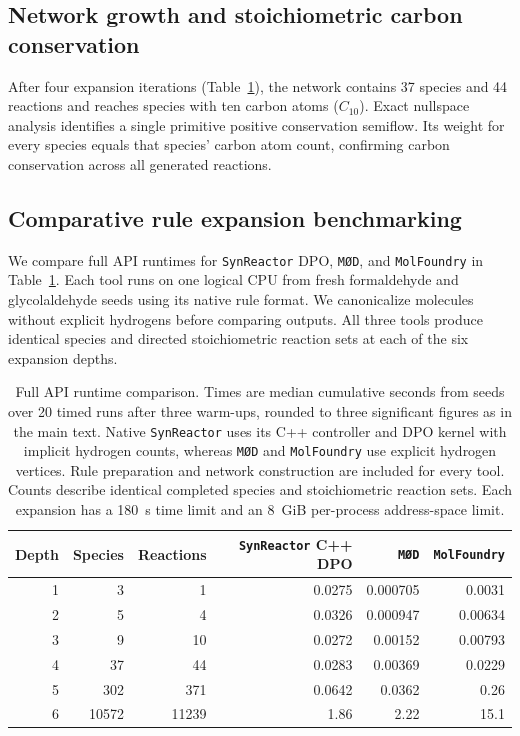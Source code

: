 \documentclass[10pt,a4paper,fleqn]{article}
\theoremstyle{plain}\newtheorem{theorem}{Theorem}
\begin{document}
\subsection{Network growth and stoichiometric carbon conservation}

After four expansion iterations (Table~\ref{tab:formose_dpo_comparison}), the network contains 37 species and 44 reactions and reaches species with ten carbon atoms ($C_{10}$). Exact nullspace analysis identifies a single primitive positive conservation semiflow. Its weight for every species equals that species' carbon atom count, confirming carbon conservation across all generated reactions.

\subsection{Comparative rule expansion benchmarking}

We compare full API runtimes for \texttt{SynReactor} DPO, \texttt{M{\O}D}, and \texttt{MolFoundry} in Table~\ref{tab:formose_dpo_comparison}. Each tool runs on one logical CPU from fresh formaldehyde and glycolaldehyde seeds using its native rule format. We canonicalize molecules without explicit hydrogens before comparing outputs. All three tools produce identical species and directed stoichiometric reaction sets at each of the six expansion depths.

\begin{table}[htbp]
\centering
\caption{Full API runtime comparison. Times are median cumulative seconds from seeds over 20 timed runs after three warm-ups, rounded to three significant figures as in the main text. Native \texttt{SynReactor} uses its C++ controller and DPO kernel with implicit hydrogen counts, whereas \texttt{M{\O}D} and \texttt{MolFoundry} use explicit hydrogen vertices. Rule preparation and network construction are included for every tool. Counts describe identical completed species and stoichiometric reaction sets. Each expansion has a 180~s time limit and an 8~GiB per-process address-space limit.}
\label{tab:formose_dpo_comparison}
\scriptsize
\setlength{\tabcolsep}{3pt}
\begin{tabular*}{\linewidth}{@{\extracolsep{\fill}}rrrrrr@{}}
\toprule
Depth & Species & Reactions & \texttt{SynReactor} C++ DPO & \texttt{M{\O}D} & \texttt{MolFoundry} \\
\midrule
1 & 3 & 1 & 0.0275 & 0.000705 & 0.0031 \\
2 & 5 & 4 & 0.0326 & 0.000947 & 0.00634 \\
3 & 9 & 10 & 0.0272 & 0.00152 & 0.00793 \\
4 & 37 & 44 & 0.0283 & 0.00369 & 0.0229 \\
5 & 302 & 371 & 0.0642 & 0.0362 & 0.26 \\
6 & 10572 & 11239 & 1.86 & 2.22 & 15.1 \\
\bottomrule
\end{tabular*}
\end{table}
\end{document}
